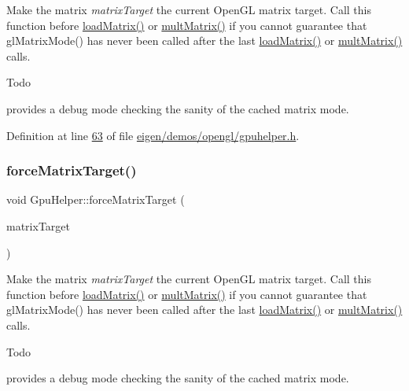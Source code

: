 Make the matrix {\itshape matrix\+Target} the current Open\+GL matrix target. Call this function before \hyperlink{class_gpu_helper_a31ac77373dc54409648558d79d5a8c3e}{load\+Matrix()} or \hyperlink{class_gpu_helper_a3abb45392e7dcf6450fa94bd345d9096}{mult\+Matrix()} if you cannot guarantee that gl\+Matrix\+Mode() has never been called after the last \hyperlink{class_gpu_helper_a31ac77373dc54409648558d79d5a8c3e}{load\+Matrix()} or \hyperlink{class_gpu_helper_a3abb45392e7dcf6450fa94bd345d9096}{mult\+Matrix()} calls. \begin{DoxyRefDesc}{Todo}
\item[\hyperlink{todo__todo000001}{Todo}]provides a debug mode checking the sanity of the cached matrix mode. \end{DoxyRefDesc}


Definition at line \hyperlink{eigen_2demos_2opengl_2gpuhelper_8h_source_l00063}{63} of file \hyperlink{eigen_2demos_2opengl_2gpuhelper_8h_source}{eigen/demos/opengl/gpuhelper.\+h}.

\mbox{\label{class_gpu_helper_a52a9ab12d07acbf4ad80737595a9b06e}} 
\subsubsection{\texorpdfstring{force\+Matrix\+Target()}{forceMatrixTarget()}\hspace{0.1cm}{\footnotesize\ttfamily [2/2]}}
{\footnotesize\ttfamily void Gpu\+Helper\+::force\+Matrix\+Target (\begin{DoxyParamCaption}\item[{G\+Lenum}]{matrix\+Target }\end{DoxyParamCaption})\hspace{0.3cm}{\ttfamily [inline]}}

Make the matrix {\itshape matrix\+Target} the current Open\+GL matrix target. Call this function before \hyperlink{class_gpu_helper_a31ac77373dc54409648558d79d5a8c3e}{load\+Matrix()} or \hyperlink{class_gpu_helper_a3abb45392e7dcf6450fa94bd345d9096}{mult\+Matrix()} if you cannot guarantee that gl\+Matrix\+Mode() has never been called after the last \hyperlink{class_gpu_helper_a31ac77373dc54409648558d79d5a8c3e}{load\+Matrix()} or \hyperlink{class_gpu_helper_a3abb45392e7dcf6450fa94bd345d9096}{mult\+Matrix()} calls. \begin{DoxyRefDesc}{Todo}
\item[\hyperlink{todo__todo000004}{Todo}]provides a debug mode checking the sanity of the cached matrix mode. \end{DoxyRefDesc}



